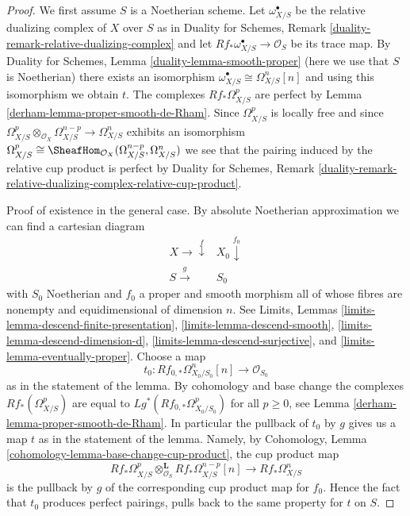 \begin{proof}

We first assume $S$ is a Noetherian scheme.
Let $\omega^\bullet_{X/S}$ be the relative dualizing complex of $X$ over $S$ as
in Duality for Schemes, Remark \ref{duality-remark-relative-dualizing-complex}
and let $Rf_*\omega_{X/S}^\bullet \to \mathcal{O}_S$ be its trace map. By
Duality for Schemes, Lemma \ref{duality-lemma-smooth-proper}
(here we use that $S$ is Noetherian)
there exists an isomorphism $\omega^\bullet_{X/S} \cong \Omega^n_{X/S}[n]$
and using this isomorphism we obtain $t$. The complexes $Rf_*\Omega^p_{X/S}$
are perfect by Lemma \ref{derham-lemma-proper-smooth-de-Rham}.
Since $\Omega^p_{X/S}$ is locally free and since
$\Omega^p_{X/S} \otimes_{\mathcal{O}_X} \Omega^{n - p}_{X/S} \to
\Omega^n_{X/S}$ exhibits an isomorphism $\Omega^p_{X/S} \cong
\SheafHom_{\mathcal{O}_X}(\Omega^{n - p}_{X/S}, \Omega^n_{X/S})$
we see that the pairing induced by the relative cup product is perfect by
Duality for Schemes, Remark
\ref{duality-remark-relative-dualizing-complex-relative-cup-product}.

\medskip\noindent
Proof of existence in the general case.
By absolute Noetherian approximation we can find a cartesian diagram
$$
\begin{array}{cc}X \longrightarrow\overset{f}{\downarrow} & X_0 \overset{f_0}{\downarrow} \\ S \overset{g}{\longrightarrow} & S_0\end{array}
$$
with $S_0$ Noetherian and $f_0$ a proper and smooth morphism
all of whose fibres are nonempty and equidimensional of dimension $n$.
See Limits, Lemmas \ref{limits-lemma-descend-finite-presentation},
\ref{limits-lemma-descend-smooth}, \ref{limits-lemma-descend-dimension-d},
\ref{limits-lemma-descend-surjective}, and
\ref{limits-lemma-eventually-proper}. Choose a map
$$
t_0 : Rf_{0, *}\Omega^n_{X_0/S_0}[n] \longrightarrow \mathcal{O}_{S_0}
$$
as in the statement of the lemma. By cohomology and base change the
complexes $Rf_*(\Omega^p_{X/S})$ are equal to
$Lg^*(Rf_{0, *}\Omega^p_{X_0/S_0})$ for all $p \geq 0$, see
Lemma \ref{derham-lemma-proper-smooth-de-Rham}. In particular the pullback
of $t_0$ by $g$ gives us a map $t$ as in the statement of the lemma.
Namely, by Cohomology, Lemma \ref{cohomology-lemma-base-change-cup-product},
the cup product map
$$
Rf_*\Omega^p_{X/S}
\otimes_{\mathcal{O}_S}^\mathbf{L}
Rf_*\Omega^{n - p}_{X/S}[n]
\longrightarrow
Rf_*\Omega^n_{X/S}
$$
is the pullback by $g$ of the corresponding cup product map for $f_0$.
Hence the fact that $t_0$ produces perfect pairings, pulls back to
the same property for $t$ on $S$.


\end{proof}

